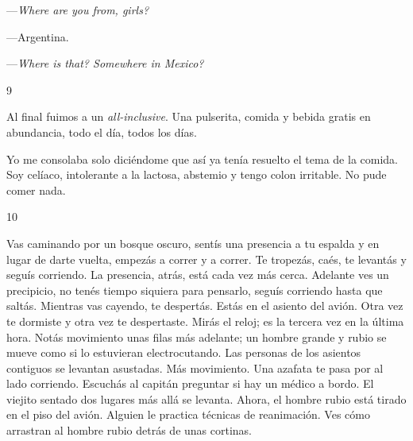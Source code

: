 \documentclass[12pt,twoside,openright,a5paper]{book}
\begin{document}
\nopagebreak

\vspace{0.5cm}

\nopagebreak

---\emph{Where are you from, girls?}

---Argentina.

---\emph{Where is that? Somewhere in Mexico?}

\vspace{0.5cm}

\hrulefill \hspace{0.1cm}\decofourleft\hspace{0.2cm} 9 \hspace{0.2cm}\decofourright \hspace{0.1cm}\hrulefill

\nopagebreak

\vspace{0.5cm}

\nopagebreak

Al final fuimos a un \emph{all-inclusive}. Una pulserita, comida y bebida gratis en abundancia, todo el día, todos los días.

Yo me consolaba solo diciéndome que así ya tenía resuelto el tema de
la comida. Soy celíaco, intolerante a la lactosa, abstemio y tengo colon
irritable. No pude comer nada.


\vspace{0.5cm}

\hrulefill \hspace{0.1cm}\decofourleft\hspace{0.2cm} 10 \hspace{0.2cm}\decofourright \hspace{0.1cm}\hrulefill

\nopagebreak

\vspace{0.5cm}

\nopagebreak

Vas caminando por un bosque oscuro, sentís una presencia a tu espalda
y en lugar de darte vuelta, empezás a correr y a correr. Te tropezás,
caés, te levantás y seguís corriendo. La presencia, atrás, está cada vez
más cerca. Adelante ves un precipicio, no tenés tiempo siquiera
para pensarlo, seguís corriendo hasta que saltás. Mientras vas cayendo, te
despertás. Estás en el asiento del avión. Otra vez te dormiste y otra vez
te despertaste. Mirás el reloj; es la tercera vez en la última hora. Notás
movimiento unas filas más adelante; un hombre grande y rubio se mueve  como
si lo estuvieran electrocutando. Las personas de los asientos contiguos
se levantan asustadas. Más movimiento. Una azafata te pasa por al lado
corriendo. Escuchás al capitán preguntar si hay un médico a bordo. El
viejito sentado dos lugares más allá se levanta. Ahora, el hombre rubio
está tirado en el piso del avión. Alguien le practica técnicas de
reanimación. Ves cómo arrastran al hombre rubio detrás de
unas cortinas.
\end{document}
